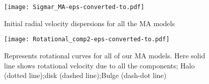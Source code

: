 \documentclass[a4paper,fleqn,usenatbib,useAMS]{mnras}
\begin{document}
\begin{figure}
\texttt{[image: Sigmar\_MA-eps-converted-to.pdf]}
\caption{Initial radial velocity dispersions for all the MA models}
\label{fig sigma_MA}
\end{figure}


\begin{figure}

\texttt{[image: Rotational\_comp2-eps-converted-to.pdf]}
\caption{Represents rotational curves for all of our MA models. Here solid line shows rotational velocity due to all the components; Halo (dotted line);disk (dashed line);Bulge (dash-dot line)}
\label{fig:rotcomp_MA}
\end{figure}
\end{document}
